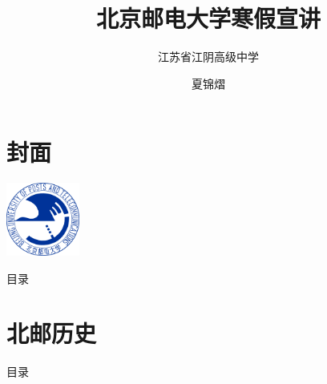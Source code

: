 \documentclass[aspectratio=169, utf8, fontset=windows]{beamer}
\title[北京邮电大学]{北京邮电大学寒假宣讲}
\subtitle{江苏省江阴高级中学}
\author{夏锦熠}
\institute[网络空间安全学院]{北京邮电大学网络空间安全学院}
\date{}
\begin{document}
\section*{封面}

\begin{frame}
    \centering
    \vspace{1em}
    \includegraphics[width=0.18\textwidth]{./resources/logo.png}\\[0pt]
    \titlepage
\end{frame}

\setlength{\parskip}{0.5em}

\begin{frame}{目录}
    \begin{multicols}{2}
        \tableofcontents
    \end{multicols}
\end{frame}

\section{北邮历史}

\begin{frame}{目录}
    \begin{multicols}{2}
        \tableofcontents[sectionstyle=show,subsectionstyle=hide,currentsection]
    \end{multicols}
\end{frame}
\end{document}
